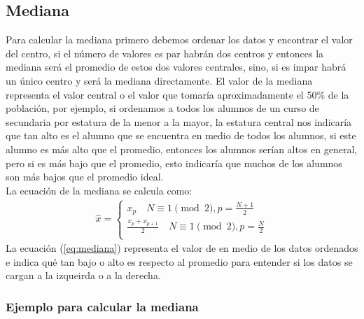 \documentclass{article}
\begin{document}
\subsection{Mediana}

Para calcular la mediana primero debemos ordenar los datos y encontrar el valor del centro, si el número de valores es par habrán dos centros y entonces la mediana será el promedio de estos dos valores centrales, sino, si es impar habrá un único centro y será la mediana directamente. El valor de la mediana representa el valor central o el valor que tomaría aproximadamente el 50\% de la población, por ejemplo, si ordenamos a todos los alumnos de un curso de secundaria por estatura de la menor a la mayor, la estatura central nos indicaría que tan alto es el alumno que se encuentra en medio de todos los alumnos, si este alumno es más alto que el promedio, entonces los alumnos serían altos en general, pero si es más bajo que el promedio, esto indicaría que muchos de los alumnos son más bajos que el promedio ideal.
\\[12pt]
La ecuación de la mediana se calcula como:
\begin{equation}
    \begin{aligned}
        \widehat{x} = 
        \begin{cases}
            x_{p} \quad N \equiv 1 \pmod{2}, p=\frac{N + 1}{2} \\
            \frac{x_{p} + x_{p + 1}}{2} \quad N \equiv 1 \pmod{2}, p=\frac{N}{2} \\
        \end{cases}
    \end{aligned}
    \label{eq:mediana}
\end{equation}
La ecuación (\ref{eq:mediana}) representa el valor de en medio de los datos ordenados e indica qué tan bajo o alto es respecto al promedio para entender si los datos se cargan a la izqueirda o a la derecha.

\subsubsection{Ejemplo para calcular la mediana}
\end{document}
